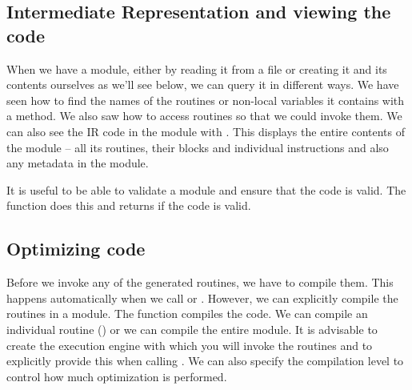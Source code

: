 \subsection{Intermediate Representation and viewing the code}
When we have a module, either by reading it from a file or creating it
and its contents ourselves as we'll see below, we can query it in
different ways.  We have seen how to find the names of the routines or
non-local variables it contains with a  method.
We also saw how to access routines so that we could invoke them.
We can also see the IR code in the module with .
This displays the entire contents of the module -- all its routines,
their blocks and individual instructions and also any metadata in
the module.

It is useful to be able to validate a module and ensure that the code
is valid.  The function  does this
and returns \Rtrue{} if the code is valid.





\subsection{Optimizing code}
Before we invoke any of the generated routines, we have to compile
them. This happens automatically when we call  or
.  However, we can explicitly compile the routines in a
module.  The function  compiles the code.  We can
compile an individual routine () or we can compile the
entire module.  It is advisable to create the execution engine with
which you will invoke the routines and to explicitly provide
this when calling .
We can also specify the compilation level to control
how much optimization is performed.




